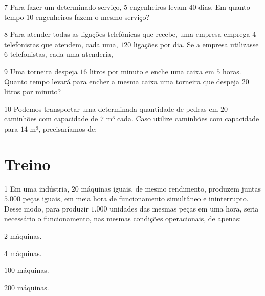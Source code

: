 
\num{7}  Para fazer um determinado serviço, $5$ engenheiros levam $40$ dias. Em
quanto tempo $10$ engenheiros fazem o mesmo serviço?


\num{8}  Para atender todas as ligações telefônicas que recebe, uma empresa
emprega $4$ telefonistas que atendem, cada uma, $120$ ligações por dia. Se a
empresa utilizasse $6$ telefonistas, cada uma atenderia,


\num{9}  Uma torneira despeja $16$ litros por minuto e enche uma caixa em $5$
horas. Quanto tempo levará para encher a mesma caixa uma torneira que
despeja $20$ litros por minuto?


\num{10}  Podemos transportar uma determinada quantidade de pedras em $20$
caminhões com capacidade de $7$ m³ cada. Caso utilize caminhões com
capacidade para $14$ m³, precisaríamos de:


\section{Treino}

\num{1}  Em uma indústria, $20$ máquinas iguais, de mesmo rendimento, produzem
juntas $5.000$ peças iguais, em meia hora de funcionamento simultâneo e
ininterrupto. Desse modo, para produzir $1.000$ unidades das mesmas peças
em uma hora, seria necessário o funcionamento, nas mesmas condições
operacionais, de apenas:

\begin{escolha}
\item $2$ máquinas.
\item $4$ máquinas.
\item $100$ máquinas.
\item $200$ máquinas.
\end{escolha}



